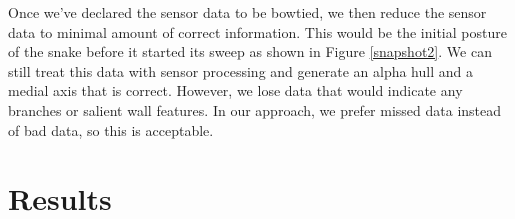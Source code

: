 Once we've declared the sensor data to be bowtied, we then reduce the sensor data to minimal amount of correct information.  This would be the initial posture of the snake before it started its sweep as shown in Figure \ref{snapshot2}.  We can still treat this data with sensor processing and generate an alpha hull and a medial axis that is correct.  However, we lose data that would indicate any branches or salient wall features.  In our approach, we prefer missed data instead of bad data, so this is acceptable.

\section{Results}

